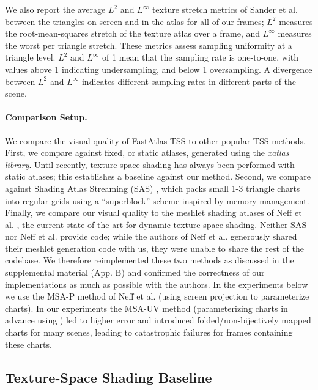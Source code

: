 We also report the average $L^{2}$ and $L^{\infty}$ texture stretch metrics of Sander et al. ~ between the triangles on screen and in the atlas for all of our frames; $L^{2}$ measures the root-mean-squares stretch of the texture atlas over a frame, and $L^{\infty}$ measures the worst per triangle stretch. These metrics assess sampling uniformity at a triangle level. $L^{2}$ and $L^{\infty}$ of 1 mean that the sampling rate is one-to-one, with values above 1 indicating undersampling, and below 1 oversampling. A divergence between $L^{2}$ and $L^{\infty}$ indicates different sampling rates in different parts of the scene. 

\vspace{-3mm}
\paragraph*{Comparison Setup.}

We compare the visual quality of FastAtlas TSS to other popular TSS methods. First, we compare against fixed, or static atlases, generated using the {\em xatlas library}. Until recently, texture space shading has always been performed with static atlases; this establishes a baseline against our method. Second, we compare against Shading Atlas Streaming (SAS) \cite{mueller2018shading}, which packs small 1-3 triangle charts into regular grids using a ``superblock'' scheme inspired by memory management. Finally, we compare our visual quality to the meshlet shading atlases of Neff et al. , the current state-of-the-art for dynamic texture space shading. Neither SAS nor Neff et al.  provide code; while the authors of Neff et al. generously shared their meshlet generation code with us, they were unable to share the rest of the codebase. We therefore reimplemented these two methods as discussed in the supplemental material (App. B) and confirmed the correctness of our implementations as much as possible with the authors. In the experiments below we use the MSA-P method of Neff et al. (using screen projection to parameterize charts). In our experiments the MSA-UV method (parameterizing charts in advance using \cite{levy2002least}) led to higher \FLIP error and introduced folded/non-bijectively mapped charts for many scenes, leading to catastrophic failures for frames containing these charts.  

\subsection{Texture-Space Shading Baseline}


